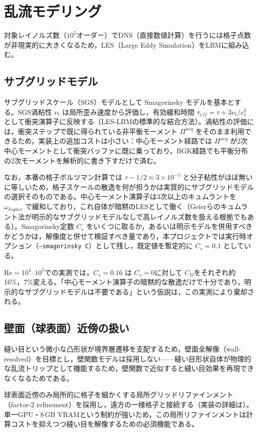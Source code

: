 \section{乱流モデリング}
\label{sec:turbulence}

対象レイノルズ数（\(10^5\)オーダー）でDNS（直接数値計算）を行うには格子点数が非現実的に大きくなるため，LES（Large Eddy Simulation）をLBMに組み込む。

\subsection{サブグリッドモデル}

サブグリッドスケール（SGS）モデルとして Smagorinsky モデルを基本とする。SGS渦粘性 \(\nu_t\) は局所歪み速度から評価し，有効緩和時間 \(\tau_{eff}=\tau+3\nu_t/c_s^2\) として衝突演算子に反映する（LES-LBMの標準的な結合方法）。渦粘性の評価には，衝突ステップで既に得られている非平衡モーメント \(\Pi^{neq}\) をそのまま利用できるため，実装上の追加コストは小さい：中心モーメント経路では \(\Pi^{neq}\) が2次中心モーメントとして衝突バッファに既に乗っており，BGK経路でも平衡分布の2次モーメントを解析的に書き下すだけで済む。

なお，本番の格子ボルツマン計算では \(\tau-1/2\approx3\times10^{-5}\) と分子粘性がほぼ無いに等しいため，格子スケールの散逸を何が担うかは実質的にサブグリッドモデルの選択そのものである。中心モーメント演算子は3次以上のキュムラントを \(\omega_{higher}\) で緩和しており，これ自体が暗黙のLESとして働く（Geierらのキュムラント法\cite{geier2015cumulant}が明示的なサブグリッドモデルなしで高レイノルズ数を扱える根拠でもある）。Smagorinsky定数 \(C_s\) をいくつに取るか，あるいは明示モデルを併用すべきかどうかは，解像度と併せて検証すべき量であり，本プロジェクトでは実行時オプション（\texttt{--smagorinsky C}）として残し，既定値を暫定的に \(C_s=0.1\) としている。

Re\(=10^4\)--\(10^5\)での実測では，\(C_s=0.16\) は \(C_s=0\)に対して \(C_D\)をそれぞれ約16\%，7\%変える。「中心モーメント演算子の暗黙的な散逸だけで十分であり，明示的なサブグリッドモデルは不要である」という仮説は，この実測により棄却される。

\subsection{壁面（球表面）近傍の扱い}

縫い目という微小な凸形状が境界層遷移を支配するため，壁面全解像（wall-resolved）を目標とし，壁関数モデルは採用しない——縫い目形状自体が物理的な乱流トリップとして機能するため，壁関数で近似すると縫い目効果を再現できなくなるためである。

球表面近傍のみ局所的に格子を細かくする局所グリッドリファインメント（factor-2 refinement）を採用し，遠方の一様格子と接続する（実装の詳細は）。単一GPU・8\,GB VRAMという制約が強いため，この局所リファインメントは計算コストを抑えつつ縫い目を解像するための必須機能である。
